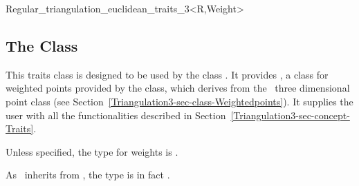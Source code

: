 	\begin{ccClassTemplate}{Regular_triangulation_euclidean_traits_3<R,Weight>}
	\subsection{The Class \protect
{} }
	\label{Triangulation3-sec-class-Regulartraits}

This traits class is designed to be used by the class
. It provides
, a class for weighted points
provided by the class, which derives from the \cgal\ three dimensional
point class (see
Section~\ref{Triangulation3-sec-class-Weightedpoints}). It supplies
the user with all the functionalities 
described in Section~\ref{Triangulation3-sec-concept-Traits}.



\ccTypes
{}

\ccGlue
{}

Unless specified, the type  for weights is . 

As \ccClassTemplateName\ inherits from
, the  type is in
fact .

	\end{ccClassTemplate}

